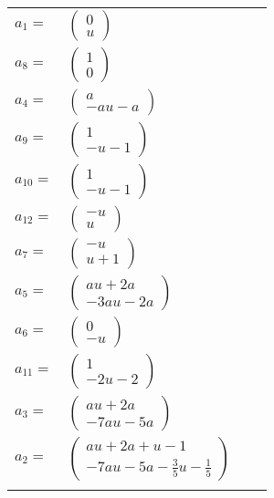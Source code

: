 \documentclass[1p]{elsarticle_modified}
\theoremstyle{definition}
\begin{document}
\begin{tabular}{m{7pt} m{180pt} m{7pt} m{180pt} }
\flushright $a_{1}=$&$\begin{pmatrix}0\\u\end{pmatrix}$ \\
\flushright $a_{8}=$&$\begin{pmatrix}1\\0\end{pmatrix}$ \\
\flushright $a_{4}=$&$\begin{pmatrix}a\\- a u- a\end{pmatrix}$ \\
\flushright $a_{9}=$&$\begin{pmatrix}1\\- u-1\end{pmatrix}$ \\
\flushright $a_{10}=$&$\begin{pmatrix}1\\- u-1\end{pmatrix}$ \\
\flushright $a_{12}=$&$\begin{pmatrix}- u\\u\end{pmatrix}$ \\
\flushright $a_{7}=$&$\begin{pmatrix}- u\\u+1\end{pmatrix}$ \\
\flushright $a_{5}=$&$\begin{pmatrix}a u+2 a\\-3 a u-2 a\end{pmatrix}$ \\
\flushright $a_{6}=$&$\begin{pmatrix}0\\- u\end{pmatrix}$ \\
\flushright $a_{11}=$&$\begin{pmatrix}1\\-2 u-2\end{pmatrix}$ \\
\flushright $a_{3}=$&$\begin{pmatrix}a u+2 a\\-7 a u-5 a\end{pmatrix}$ \\
\flushright $a_{2}=$&$\begin{pmatrix}a u+2 a+u-1\\-7 a u-5 a-\frac{3}{5} u-\frac{1}{5}\end{pmatrix}$\\&\end{tabular}
\end{document}
